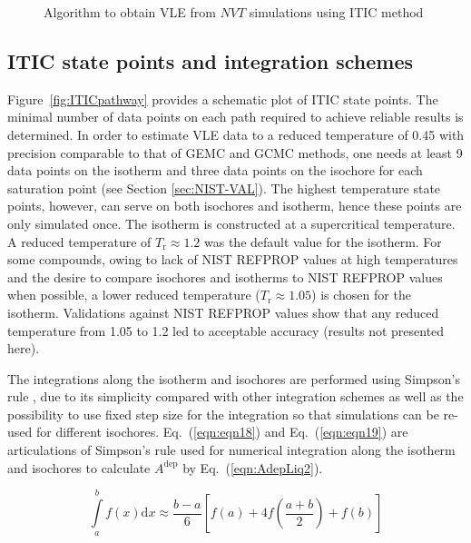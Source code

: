 \documentclass[5p,times]{elsarticle}
\begin{document}
\begin{figure}[]
\begin{tikzpicture}[node distance = 1.5cm, auto,thick,scale=0.8, every node/.style={scale=0.8}]
\end{tikzpicture}
\label{ITIC-algorithm}
\caption{Algorithm to obtain VLE from $NVT$ simulations using ITIC method}
\end{figure}




\subsection{ITIC state points and integration schemes}\label{sec:ITIC-state-points}
Figure~\ref{fig:ITICpathway} provides a schematic plot of ITIC state points. The minimal number of data points on each path required to achieve reliable results is determined. 
In order to estimate VLE data to a reduced temperature of 0.45 with precision comparable to that of GEMC and GCMC methods, one needs at least 9 data points on the isotherm and three data points on the isochore for each saturation point (see Section \ref{sec:NIST-VAL}).
The highest temperature state points, however, can serve on both isochores and isotherm, hence these points are only simulated once. The isotherm is constructed at a supercritical temperature. A reduced temperature of $T_\mathrm{r} \approx 1.2$ was the default value for the isotherm. For some compounds, owing to lack of NIST REFPROP values at high temperatures and the desire to compare isochores and isotherms to NIST REFPROP values when possible, a lower reduced temperature ($T_\mathrm{r} \approx 1.05$) is chosen for the isotherm. Validations against NIST REFPROP values show that any reduced temperature from 1.05 to 1.2 led to acceptable accuracy (results not presented here).


The integrations along the isotherm and isochores are performed using Simpson's rule \cite{atkinson2008}, due to its simplicity compared with other integration schemes as well as the possibility to use fixed step size for the integration so that simulations can be re-used for different isochores. Eq.~(\ref{eqn:eqn18}) and Eq.~(\ref{eqn:eqn19}) are
articulations of Simpson's rule used for numerical integration along the isotherm and isochores to calculate $A^{\mathrm{dep}}$ by Eq.~(\ref{eqn:AdepLiq2}).

\begin{equation}
\int\limits_a^b {f(x)\mathrm{d} x \approx \frac{{b - a}}{6}} \left[ {f(a) + 4f \left( \frac{{a + b}}{2} \right) + f(b)} \right] \label{eqn:eqn18}
\end{equation}
\end{document}
